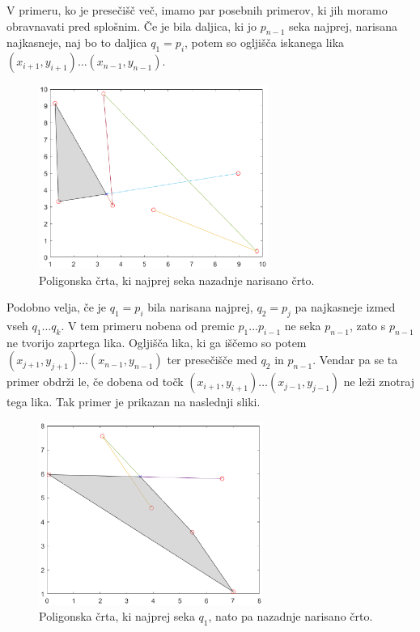 \documentclass{article}
\begin{document}
V primeru, ko je presečišč več, imamo par posebnih primerov, ki jih moramo obravnavati pred splošnim. Če je bila daljica,
ki jo $p_{n-1}$ seka najprej, narisana najkasneje, naj bo to daljica $q_1 = p_i$, potem so ogljišča iskanega lika 
$(x_{i+1}, y_{i+1}) \dots (x_{n-1}, y_{n-1})$.
\begin{figure}[H]
    \centering
        \includegraphics[height = 6cm]{k_max.eps}
        \caption{Poligonska črta, ki najprej seka nazadnje narisano črto.}
\end{figure}

Podobno velja, če je $q_1 = p_i$ bila narisana najprej, $q_2 = p_j$ pa najkasneje izmed vseh $q_1 \dots q_k$. V tem primeru 
nobena od premic $p_1 \dots p_{i-1}$ ne seka $p_{n-1}$, zato s $p_{n-1}$ ne tvorijo zaprtega lika. Ogljišča lika, ki ga iščemo 
so potem $(x_{j+1}, y_{j+1}) \dots (x_{n-1}, y_{n-1})$ ter presečišče med $q_2$ in $p_{n-1}$. Vendar pa se ta primer obdrži le,
če dobena od točk $(x_{i+1}, y_{i+1}) \dots (x_{j-1}, y_{j-1})$ ne leži znotraj tega lika. Tak primer je prikazan na naslednji
sliki. 
\begin{figure}[H]
    \centering
        \includegraphics[height = 6cm]{ni_tocke_v_test.eps}
        \caption{Poligonska črta, ki najprej seka $q_1$, nato pa nazadnje narisano črto.}
\end{figure}
\end{document}
